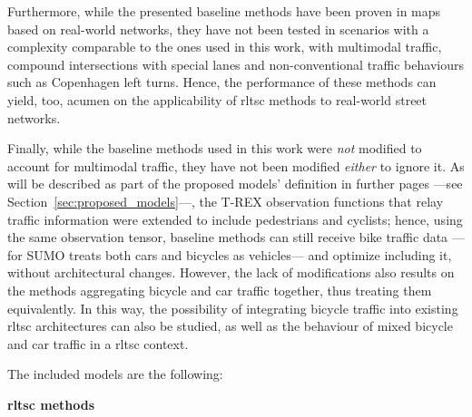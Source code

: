 Furthermore, while the presented baseline methods have been proven in maps based on real-world networks, they have not been tested in scenarios with a complexity comparable to the ones used in this work, with multimodal traffic, compound intersections with special lanes and non-conventional traffic behaviours such as Copenhagen left turns. Hence, the performance of these methods can yield, too, acumen on the applicability of \gls{rltsc} methods to real-world street networks.

Finally, while the baseline methods used in this work were \textit{not} modified to account for multimodal traffic, they have not been modified \textit{either} to ignore it. As will be described as part of the proposed models' definition in further pages —see Section~\ref{sec:proposed_models}—, the T-REX observation functions that relay traffic information were extended to include pedestrians and cyclists; hence, using the same observation tensor, baseline methods can still receive bike traffic data —for SUMO treats both cars and bicycles as vehicles— and optimize including it, without architectural changes. However, the lack of modifications also results on the methods aggregating bicycle and car traffic together, thus treating them equivalently. In this way, the possibility of integrating bicycle traffic into existing \gls{rltsc} architectures can also be studied, as well as the behaviour of mixed bicycle and car traffic in a \gls{rltsc} context.

The included models are the following:

\medskip

\noindent \textbf{\Gls{rltsc} methods}

